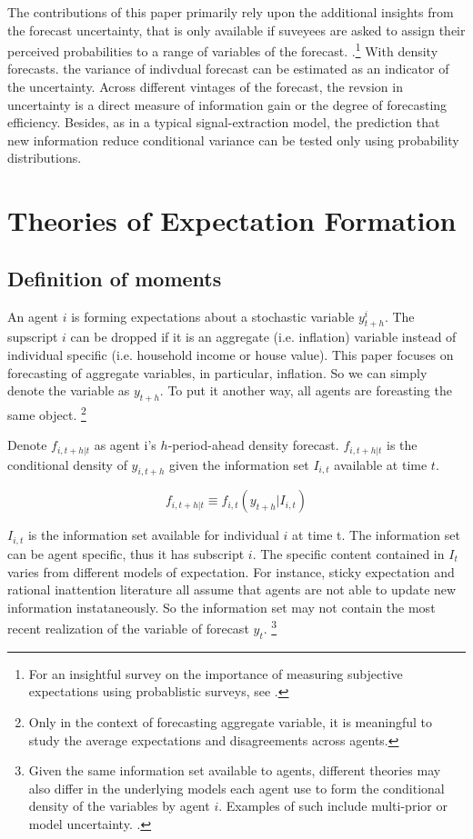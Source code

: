 \documentclass[]{article}
\begin{document}
The contributions of this paper primarily rely upon the additional insights from the forecast uncertainty, that is only available if suveyees are asked to assign their perceived probabilities to a range of variables of the forecast. .\footnote{For an insightful survey on the importance of measuring subjective expectations using probablistic surveys, see \citet{manski2004measuring}.} With density forecasts. the variance of indivdual forecast can be estimated as an indicator of the uncertainty. Across different vintages of the forecast, the revsion in uncertainty is a direct measure of  information gain or the degree of forecasting efficiency. Besides, as in a typical signal-extraction model, the prediction that new information reduce conditional variance can be tested only using probability distributions.   

\section{Theories of Expectation Formation}\label{theory}

\subsection{Definition of moments}

An agent $i$ is forming expectations about a stochastic variable $y^i_{t+h}$. The supscript $i$ can be dropped if it is an aggregate (i.e. inflation) variable instead of individual specific  (i.e. household income or house value). This paper focuses on forecasting of aggregate variables, in particular, inflation. So we can simply denote the variable as $y_{t+h}$. To put it another way, all agents are foreasting the same object. \footnote{Only in the context of forecasting aggregate variable, it is meaningful to study the average expectations and disagreements across agents.}

Denote $ f_{i,t+h|t}$ as agent i's $h$-period-ahead density forecast. $ f_{i,t+h|t}$ is the conditional density of $y_{i,t+h}$ given the information set $I_{i,t}$ available at time $t$. 

$$f_{i,t+h|t} \equiv f_{i,t}(y_{t+h}|I_{i,t})$$


$I_{i,t}$ is the information set available for individual $i$ at time t. The information set can be  agent specific, thus it has subscript $i$.  The specific content contained in $I_t$ varies from different models of expectation. For instance, sticky expectation and rational inattention literature all assume that agents are not able to update new information instataneously. So the information set may not contain the most recent realization of the variable of forecast $y_t$. \footnote{Given the same information set available to agents, different theories may also differ in the underlying models each agent use to form the conditional density of the variables by agent $i$. Examples of such include multi-prior or model uncertainty. \citet{xx}. }
\end{document}
